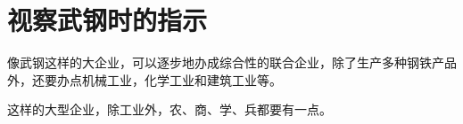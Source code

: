 \section[视察武钢时的指示（一九五八年九月十三日）]{视察武钢时的指示}


像武钢这样的大企业，可以逐步地办成综合性的联合企业，除了生产多种钢铁产品外，还要办点机械工业，化学工业和建筑工业等。

这样的大型企业，除工业外，农、商、学、兵都要有一点。


